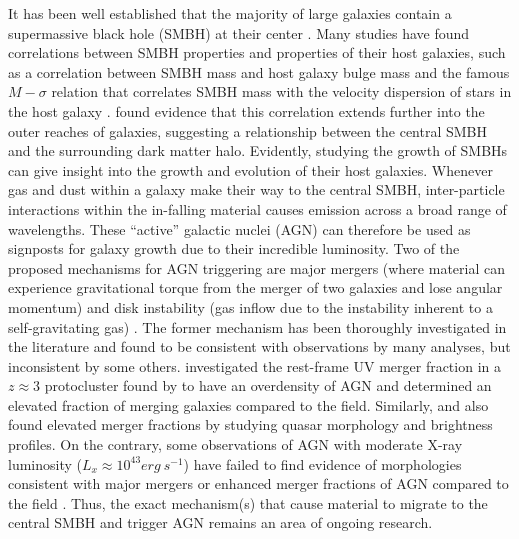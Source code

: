 \documentclass[preprint]{aastex63}
\begin{document}
It has been well established that the majority of large galaxies contain a supermassive black hole (SMBH)
at their center \citep{magorrian}. Many studies have found correlations between SMBH properties and properties of their 
host galaxies, such as a correlation between SMBH mass and host galaxy bulge mass \citep{mcconnel} and the famous $M-\sigma$ relation that correlates SMBH mass with 
the velocity dispersion of stars in the host galaxy \citep{gebhardt}. \citet{baes:2003} found evidence that this correlation extends further into the outer reaches of 
galaxies, suggesting a relationship between the central SMBH and the surrounding dark matter halo. Evidently, studying the growth of SMBHs can give insight into the growth 
and evolution of their host galaxies.  Whenever gas and dust within a galaxy make their way to the central SMBH, inter-particle interactions within the 
in-falling material causes emission across a broad range of wavelengths. These ``active'' galactic nuclei (AGN) can 
therefore be used as signposts for galaxy growth due to their incredible luminosity. 
 Two of the proposed mechanisms for AGN triggering are major mergers (where material can experience gravitational torque from the merger of two galaxies and lose angular momentum) and disk instability (gas inflow due to the instability 
inherent to a self-gravitating gas) \citep{oogi}. The former mechanism  has been thoroughly investigated in the literature and found to be consistent with observations by many analyses, but inconsistent by some others. 
\citet{hine} investigated the rest-frame UV merger fraction in a $z\approx 3$ protocluster found by \citet{lehmer} to have an overdensity of AGN and determined an elevated fraction of merging galaxies compared to the field. Similarly, \citet{fan} and \citet{glikman} 
also found elevated merger fractions by studying quasar morphology and brightness profiles. On the contrary,  some observations of AGN with moderate X-ray luminosity ($L_x \approx 10^{43} erg \ s^{-1}$) have failed to find evidence of morphologies consistent with major mergers \citep{kocevski,cisternas:2011} 
or enhanced merger fractions of AGN compared to the field \citep{marian:2019}. Thus, the exact mechanism(s) that cause material to migrate to the central SMBH and trigger AGN remains an area of ongoing research. 
\end{document}
